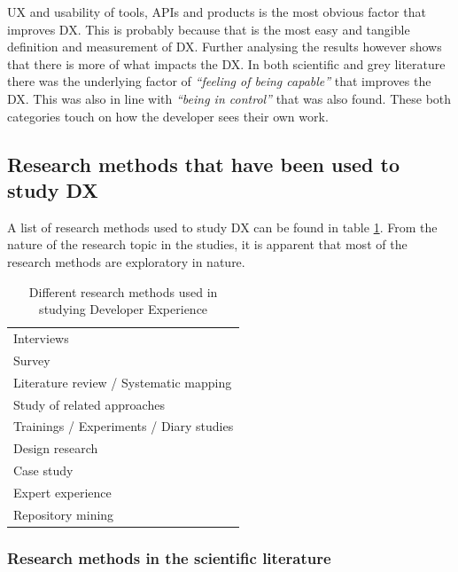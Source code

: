 \documentclass[english, 12pt, a4paper, sci, utf8, a-1b, online]{aaltothesis}
\begin{document}
UX and usability of tools, APIs and products is the most obvious factor that improves DX. This is probably because that is the most easy and tangible definition and measurement of DX. Further analysing the results however shows that there is more of what impacts the DX. In both scientific and grey literature there was the underlying factor of \textit{``feeling of being capable''} that improves the DX. This was also in line with \textit{``being in control''} that was also found. These both categories touch on how the developer sees their own work.

\subsection{Research methods that have been used to study DX}

A list of research methods used to study DX can be found in table \ref{table:research-methods}. From the nature of the research topic in the studies, it is apparent that most of the research methods are exploratory in nature.

\begin{table}[ht]
  \begin{center}
    \begin{tabular}{l}
      \hline
      Interviews                              \\
      Survey                                  \\
      Literature review / Systematic mapping  \\
      Study of related approaches             \\
      Trainings / Experiments / Diary studies \\
      Design research                         \\
      Case study                              \\
      Expert experience                       \\
      Repository mining                       \\
      \hline
    \end{tabular}
    \captionsetup{width=0.6\textwidth}
    \caption{Different research methods used in studying Developer Experience}
    \label{table:research-methods}
  \end{center}
\end{table}

\subsubsection{Research methods in the scientific literature}
\end{document}
